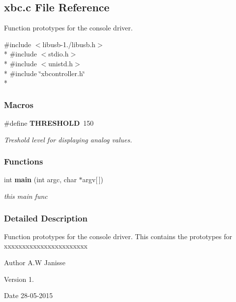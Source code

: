 \subsection{xbc.\-c File Reference}
\label{xbc_8c}


Function prototypes for the console driver.  


{\ttfamily \#include $<$libusb-\/1./libusb.\-h$>$}\\*
{\ttfamily \#include $<$stdio.\-h$>$}\\*
{\ttfamily \#include $<$unistd.\-h$>$}\\*
{\ttfamily \#include \char`\"{}xbcontroller.\-h\char`\"{}}\\*
\subsubsection*{Macros}
\begin{DoxyCompactItemize}
\item 
\#define {\bf T\-H\-R\-E\-S\-H\-O\-L\-D}~150\label{xbc_8c_a4679d8ea8690999a6c6c7c0cb245c879}

\begin{DoxyCompactList}\small\item\em Treshold level for displaying analog values. \end{DoxyCompactList}\end{DoxyCompactItemize}
\subsubsection*{Functions}
\begin{DoxyCompactItemize}
\item 
int {\bf main} (int argc, char $\ast$argv[$\,$])
\begin{DoxyCompactList}\small\item\em this main func \end{DoxyCompactList}\end{DoxyCompactItemize}


\subsubsection{Detailed Description}
Function prototypes for the console driver. This contains the prototypes for xxxxxxxxxxxxxxxxxxxxxxx

\begin{DoxyAuthor}{Author}
A.\-W Janisse 
\end{DoxyAuthor}
\begin{DoxyVersion}{Version}
1. 
\end{DoxyVersion}
\begin{DoxyDate}{Date}
28-\/05-\/2015 
\end{DoxyDate}


